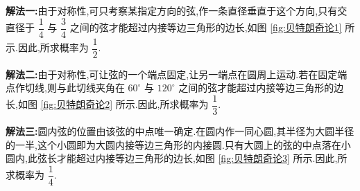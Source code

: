 \begin{solution}

    \textbf{解法一:}由于对称性,可只考察某指定方向的弦,作一条直径垂直于这个方向,只有交直径于 $\dfrac{1}{4}$ 与 $\dfrac{3}{4}$ 之间的弦才能超过内接等边三角形的边长,如图 \ref{fig:贝特朗奇论1} 所示.因此,所求概率为 $\dfrac{1}{2}$.

    \vspace{0.5em}

    \textbf{解法二:}由于对称性,可让弦的一个端点固定,让另一端点在圆周上运动.若在固定端点作切线,则与此切线夹角在 $60^{\circ}$ 与 $120^{\circ}$ 之间的弦才能超过内接等边三角形的边长,如图 \ref{fig:贝特朗奇论2} 所示.因此,所求概率为 $\dfrac{1}{3}$.

    \vspace{0.5em}

    \textbf{解法三:}圆内弦的位置由该弦的中点唯一确定.在圆内作一同心圆,其半径为大圆半径的一半,这个小圆即为大圆内接等边三角形的内接圆.只有大圆上的弦的中点落在小圆内,此弦长才能超过内接等边三角形的边长,如图 \ref{fig:贝特朗奇论3} 所示.因此,所求概率为 $\dfrac{1}{4}$.

    \begin{figure}[H]
        \centering


\end{figure}
\end{solution}
